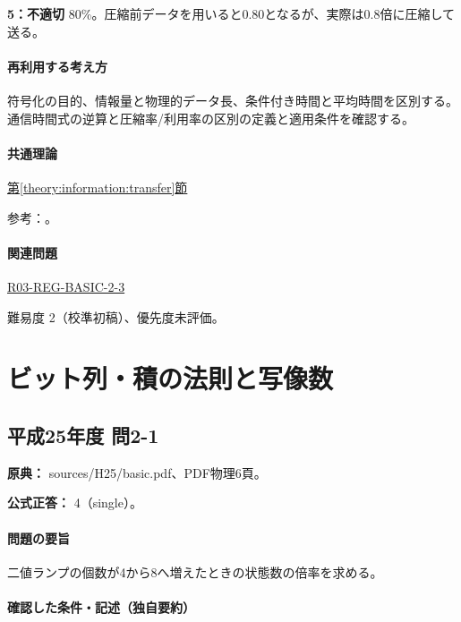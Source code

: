 \noindent\textbf{5：不適切} 80\%。圧縮前データを用いると0.80となるが、実際は0.8倍に圧縮して送る。\par

\paragraph{再利用する考え方} 符号化の目的、情報量と物理的データ長、条件付き時間と平均時間を区別する。通信時間式の逆算と圧縮率/利用率の区別の定義と適用条件を確認する。

\paragraph{共通理論} \hyperref[theory:information:transfer]{第\ref*{theory:information:transfer}節}

\par 参考：\cite{info_deflate}。

\paragraph{関連問題} \hyperref[q:r03-reg-basic-2-3]{R03-REG-BASIC-2-3}

\par 難易度 2（校準初稿）、優先度未評価。

\section{ビット列・積の法則と写像数}

\subsection{平成25年度 問2-1}
\label{q:h25-reg-basic-2-1}

\noindent\textbf{原典：} sources/H25/basic.pdf、PDF物理6頁。

\textbf{公式正答：} 4（single）。

\paragraph{問題の要旨} 二値ランプの個数が4から8へ増えたときの状態数の倍率を求める。

\paragraph{確認した条件・記述（独自要約）}\mbox{}\par

